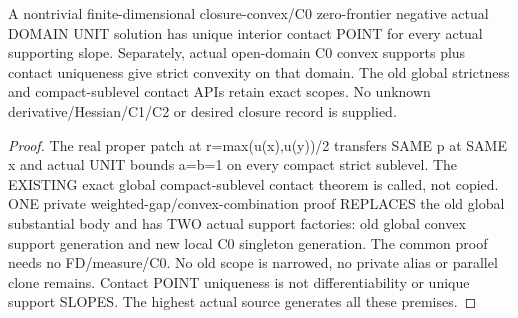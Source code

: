 \begin{lemma}
  \label{lem:domain-unit-interior-strictness}
  \leanok
  A nontrivial finite-dimensional closure-convex/C0 zero-frontier negative
  actual DOMAIN UNIT solution has unique interior contact POINT for every
  actual supporting slope. Separately, actual open-domain C0 convex supports
  plus contact uniqueness give strict convexity on that domain. The old
  global strictness and compact-sublevel contact APIs retain exact scopes.
  No unknown derivative/Hessian/C1/C2 or desired closure record is supplied.
\end{lemma}
\begin{proof}
  \leanok
  The real proper patch at r=max(u(x),u(y))/2 transfers SAME p at SAME x and
  actual UNIT bounds a=b=1 on every compact strict sublevel. The EXISTING
  exact global compact-sublevel contact theorem is called, not copied. ONE
  private weighted-gap/convex-combination proof REPLACES the old global
  substantial body and has TWO actual support factories: old global convex
  support generation and new local C0 singleton generation. The common proof
  needs no FD/measure/C0. No old scope is narrowed, no private alias or parallel
  clone remains. Contact POINT uniqueness is not differentiability or unique
  support SLOPES. The highest actual source generates all these premises.
\end{proof}


